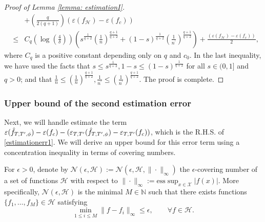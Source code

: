 \documentclass{article}
\def\NN{\mathbb N}
\begin{document}
\begin{proof}[Proof of Lemma \ref{lemma: estimationI}]
\begin{eqnarray*}
 &&+ \left(\frac{q}{2(q+1)}\right)(\varepsilon(f_\mathcal{H}) - \varepsilon(f_c))\\
 &\leq& C_{q} \left(\log\left(\frac{4}{\delta}\right)\right)\left(s^{\frac{1}{q+2}}\left(\frac{1}{n}\right)^{\frac{q+1}{q+2}}+(1-s)^{\frac{1}{q+2}}\left(\frac{1}{n^\prime}\right)^{\frac{q+1}{q+2}}\right) + \frac{(\varepsilon(f_\mathcal{H}) - \varepsilon(f_c))}{2},
    \end{eqnarray*}
    where $C_{q}$ is a positive constant depending only on $q$ and $c_0$. 
    In the last inequality, we have used the facts that $s \leq s^{\frac{1}{q+2}}, 1-s \leq (1-s)^{\frac{1}{q+2}}$ for all $s \in (0,1]$ and $q>0$; and that $\frac{1}{n} \leq \left(\frac{1}{n}\right)^{\frac{q+1}{q+2}}, \frac{1}{n^\prime} \leq \left(\frac{1}{n^\prime}\right)^{\frac{q+1}{q+2}}$.   
    The proof is complete.
\end{proof}

\subsubsection{Upper bound of the second  estimation error}
Next, we will handle estimate the term $\varepsilon(\Hat{f}_{T, T^\prime,\phi}) -\varepsilon(f_c)- (\varepsilon_{T, T'}(\Hat{f}_{T, T^\prime,\phi})-\varepsilon_{T, T'}(f_c))$, which is the R.H.S. of \eqref{estimationerr1}.
We will derive an upper bound for this error term using a concentration inequality in terms of covering numbers.

For $\epsilon >0$, denote by $\mathcal{N}(\epsilon,\mathcal{H}):=\mathcal{N}(\epsilon,\mathcal{H},\|\cdot\|_\infty)$ the $\epsilon$-covering number of a set of functions $\mathcal{H}$ with respect to $\|\cdot\|_\infty:=  \text{ess} \sup_{x\in\mathcal{X}}|f(x)|$. More specifically, $\mathcal{N}(\epsilon,\mathcal{H})$ is the minimal $M\in \NN$ such that there exists functions $\{f_1,\ldots, f_M\}\in \mathcal{H}$ satisfying
\begin{equation}
    \min_{1\leq i \leq M} \|f-f_i\|_\infty \leq \epsilon, \qquad \forall f\in \mathcal{H}.
\end{equation}
\end{document}

